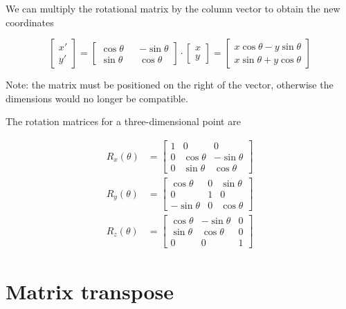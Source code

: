 \documentclass{article}
\begin{document}
We can multiply the rotational matrix by the column vector to obtain the new coordinates

\[
    \begin{bmatrix} 
        x' \\
        y'
    \end{bmatrix}
    =
    \begin{bmatrix} 
        \cos\theta && -\sin\theta \\
        \sin\theta && \cos\theta
    \end{bmatrix}
    \cdot
    \begin{bmatrix} 
        x \\
        y
    \end{bmatrix}
    =
    \begin{bmatrix} 
        x\cos\theta - y\sin\theta \\
        x\sin\theta + y\cos\theta
    \end{bmatrix}
\]

Note: the matrix must be positioned on the right of the vector, otherwise the dimensions would no longer be compatible.

The rotation matrices for a three-dimensional point are

\begin{align*}
    R_x(\theta)&=
    \begin{bmatrix} 
        1 & 0 & 0 \\
        0 & \cos\theta & -\sin\theta \\
        0 & \sin\theta & \cos\theta
    \end{bmatrix}
    \\
    R_y(\theta)&=
    \begin{bmatrix} 
        \cos\theta & 0 & \sin\theta \\
        0 & 1 & 0 \\
        -\sin\theta & 0 & \cos\theta
    \end{bmatrix}
    \\
    R_z(\theta)&=
    \begin{bmatrix} 
        \cos\theta & -\sin\theta & 0 \\
        \sin\theta & \cos\theta & 0 \\
        0 & 0 & 1
    \end{bmatrix}
\end{align*}

\pagebreak

\section{Matrix transpose}
\end{document}
